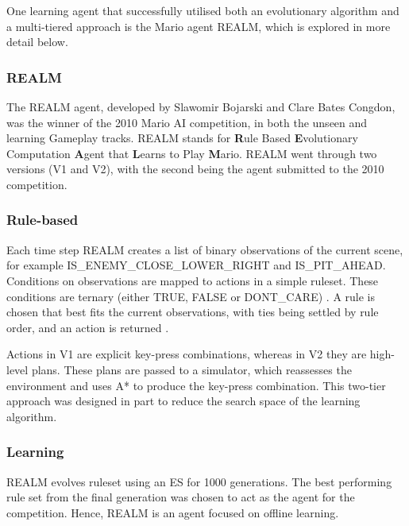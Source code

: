 \vspace{\baselineskip} \noindent
One learning agent that successfully utilised both an evolutionary algorithm and a multi-tiered approach is the Mario agent REALM, which is explored in more detail below. 

\subsubsection{REALM}
\label{ssec:realm}

The REALM agent, developed by Slawomir Bojarski and Clare Bates Congdon, was the winner of the 2010 Mario AI competition, in both the unseen and learning Gameplay tracks. REALM stands for \textbf{R}ule Based \textbf{E}volutionary Computation \textbf{A}gent that \textbf{L}earns to Play \textbf{M}ario. REALM went through two versions (V1 and V2), with the second being the agent submitted to the 2010 competition.

\subsubsection*{\hspace{6pt}Rule-based}

Each time step REALM creates a list of binary observations of the current scene, for example {\footnotesize IS\_ENEMY\_CLOSE\_LOWER\_RIGHT} and {\footnotesize IS\_PIT\_AHEAD}. Conditions on observations are mapped to actions in a simple ruleset. These conditions are ternary (either {\footnotesize TRUE}, {\footnotesize FALSE} or {\footnotesize DONT\_CARE}) \cite[p.~85]{realm}. A rule is chosen that best fits the current observations, with ties being settled by rule order, and an action is returned \cite[p.~86]{realm}.

Actions in V1 are explicit key-press combinations, whereas in V2 they are high-level plans. These plans are passed to a simulator, which reassesses the environment and uses A* to produce the key-press combination. This two-tier approach was designed in part to reduce the search space of the learning algorithm. \cite[pp.~85-87]{realm}

\subsubsection*{\hspace{6pt}Learning}

REALM evolves ruleset using an ES for 1000 generations. The best performing rule set from the final generation was chosen to act as the agent for the competition. Hence, REALM is an agent focused on offline learning. \cite[pp.~87-89]{realm}

